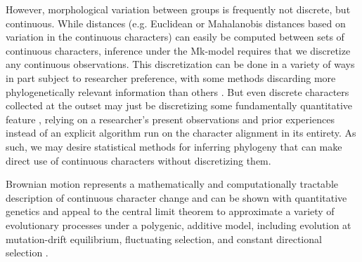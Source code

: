 However, morphological variation between groups is frequently not discrete, but continuous. While distances (e.g. Euclidean or Mahalanobis distances based on variation in the continuous characters) can easily be computed between sets of continuous characters, inference under the Mk-model \citep{lewisLikelihoodApproachEstimating2001} requires that we discretize any continuous observations. This discretization can be done in a variety of ways \citep{garcia-cruzCodingQuantitativeCharacter2006, thorpeCodingMorphometricCharacters1984} in part subject to researcher preference, with some methods discarding more phylogenetically relevant information than others \citep{brazeauProblematicCharacterCoding2011}. But even discrete characters collected at the outset may just be discretizing some fundamentally quantitative feature \citep{wiensCharacterAnalysisMorphological2001}, relying on a researcher’s present observations and prior experiences instead of an explicit algorithm run on the character alignment in its entirety. As such, we may desire statistical methods for inferring phylogeny that can make direct use of continuous characters without discretizing them.

Brownian motion represents a mathematically and computationally tractable description of continuous character change and can be shown with quantitative genetics and appeal to the central limit theorem to approximate a variety of evolutionary processes under a polygenic, additive model, including evolution at mutation-drift equilibrium, fluctuating selection, and constant directional selection \citep{hansenTranslatingMicroevolutionaryProcess1996, weaverNeutralTheoryEvolution2018a, harmonPhylogeneticComparativeMethods2018}. 

